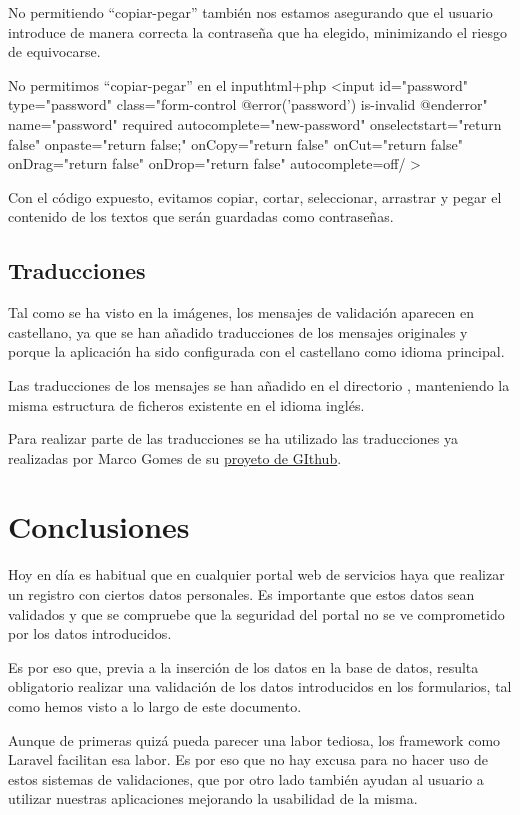 \documentclass{\ClassPath/viu-tfm-template}
\begin{document}
No permitiendo “copiar-pegar” también nos estamos asegurando que el usuario introduce de manera correcta la contraseña que ha elegido, minimizando el riesgo de equivocarse.

\begin{mycode}{No permitimos “copiar-pegar” en el input}{html+php}{}
<input id="password" type="password" class="form-control
    @error('password') is-invalid @enderror"
    name="password" required autocomplete="new-password"
    onselectstart="return false"
    onpaste="return false;"
    onCopy="return false"
    onCut="return false"
    onDrag="return false"
    onDrop="return false"
    autocomplete=off/
>
\end{mycode}

Con el código expuesto, evitamos copiar, cortar, seleccionar, arrastrar y pegar el contenido de los textos que serán guardadas como contraseñas.

\section{Traducciones}
Tal como se ha visto en la imágenes, los mensajes de validación aparecen en castellano, ya que se han añadido traducciones de los mensajes originales y porque la aplicación ha sido configurada con el castellano como idioma principal.

Las traducciones de los mensajes se han añadido en el directorio , manteniendo la misma estructura de ficheros existente en el idioma inglés.

Para realizar parte de las traducciones se ha utilizado las traducciones ya realizadas por Marco Gomes de su \href{https://github.com/MarcoGomesr/laravel-validation-en-espanol}{proyeto de GIthub}.

\chapter{Conclusiones}
Hoy en día es habitual que en cualquier portal web de servicios haya que realizar un registro con ciertos datos personales. Es importante que estos datos sean validados y que se compruebe que la seguridad del portal no se ve comprometido por los datos introducidos.

Es por eso que, previa a la inserción de los datos en la base de datos, resulta obligatorio realizar una validación de los datos introducidos en los formularios, tal como hemos visto a lo largo de este documento.

Aunque de primeras quizá pueda parecer una labor tediosa, los framework como Laravel facilitan esa labor. Es por eso que no hay excusa para no hacer uso de estos sistemas de validaciones, que por otro lado también ayudan al usuario a utilizar nuestras aplicaciones mejorando la usabilidad de la misma.
\end{document}
